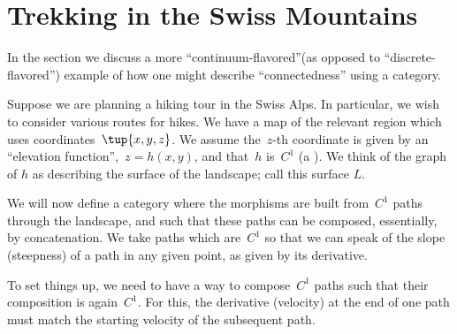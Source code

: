 
\section{Trekking in the Swiss Mountains}
\label{sec:trekking}

In the section we discuss a more ``continuum-flavored''(as opposed to ``discrete-flavored'') example of how one might describe ``connectedness'' using a category.

Suppose we are planning a hiking tour in the Swiss Alps.
In particular, we wish to consider various routes for hikes.
We have a map of the relevant region which uses coordinates~$\tup{x,y,z}$.
We assume the~$z$-th coordinate is given by an ``elevation function'',~$z = h(x,y)$, and that~$h$ is~$C^1$ (a ).
We think of the graph of $h$ as describing the surface of the landscape; call this surface $L$.

We will now define a category where the morphisms are built from~$C^1$ paths through the landscape, and such that these paths can be composed, essentially, by concatenation.
We take paths which are~$C^1$ so that we can speak of the slope (steepness) of a path in any given point, as given by its derivative.

To set things up, we need to have a way to compose~$C^1$ paths such that their composition is again~$C^1$.
For this, the derivative (velocity) at the end of one path must match the starting velocity of the subsequent path.

